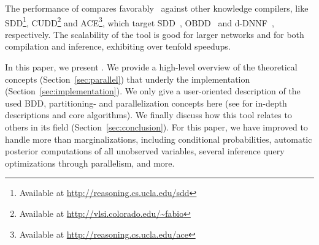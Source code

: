 The performance of \toolname compares favorably~\cite{dal2018parallel,dal2021compositional} against other knowledge compilers, like  SDD\footnote{Available at \url{http://reasoning.cs.ucla.edu/sdd}}, CUDD\footnote{Available at \url{http://vlsi.colorado.edu/~fabio}} and ACE\footnote{Available at \url{http://reasoning.cs.ucla.edu/ace}}, which target SDD~\cite{darwiche2011sdd}, OBDD~\cite{bryant1986graph} and d-DNNF~\cite{darwiche2002knowledge}, respectively. The scalability of the tool is good for larger networks and for both compilation and inference, exhibiting over tenfold speedups.

In this paper, we present \toolname. We provide a high-level overview of the theoretical concepts (Section~\ref{sec:parallel}) that underly the implementation (Section~\ref{sec:implementation}). We only give a user-oriented description of the used BDD, partitioning- and parallelization concepts here (see \cite{dal2018parallel,dal2021compositional} for in-depth descriptions and core algorithms). We finally discuss how this tool relates to others in its field (Section~\ref{sec:conclusion}). For this paper, we have improved \toolname to handle more than marginalizations, including conditional probabilities, automatic posterior computations of all unobserved variables, several inference query optimizations through parallelism, and more. 


